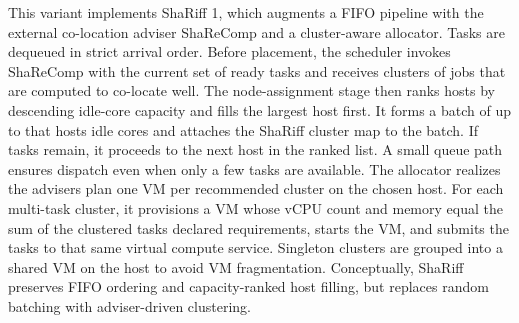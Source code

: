 This variant implements ShaRiff 1, which augments a FIFO pipeline with the external co-location adviser ShaReComp and a cluster-aware allocator. Tasks are dequeued in strict arrival order. Before placement, the scheduler invokes ShaReComp with the current set of ready tasks and receives clusters of jobs that are computed to co-locate well. The node-assignment stage then ranks hosts by descending idle-core capacity and fills the largest host first. It forms a batch of up to that hosts idle cores and attaches the ShaRiff cluster map to the batch. If tasks remain, it proceeds to the next host in the ranked list. A small queue path ensures dispatch even when only a few tasks are available.
The allocator realizes the advisers plan one VM per recommended cluster on the chosen host. For each multi-task cluster, it provisions a VM whose vCPU count and memory equal the sum of the clustered tasks declared requirements, starts the VM, and submits the tasks to that same virtual compute service. Singleton clusters are grouped into a shared VM on the host to avoid VM fragmentation.
Conceptually, ShaRiff preserves FIFO ordering and capacity-ranked host filling, but replaces random batching with adviser-driven clustering.

